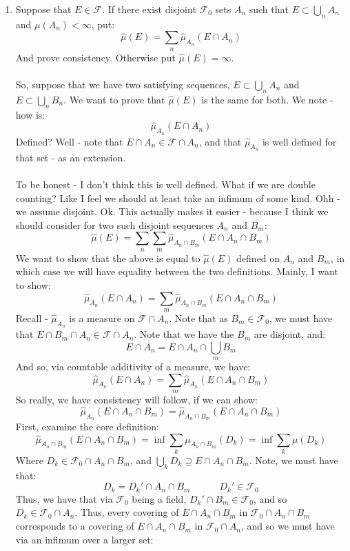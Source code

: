 \documentclass[12pt,a4paper]{article}
\newcommand{\1}[1]{\mathbbm{1}\left\{ #1 \right\}}
\newcommand{\fcal}{\mathcal{F}}
\begin{document}
\begin{enumerate}
	\item Suppose that $E \in \fcal$. If there exist disjoint $\fcal_0$ sets $A_n$ such that $E \subset \bigcup_n A_n$ and $\mu(A_n) < \infty$, put:
	$$
		\hat{\mu}(E) = \sum_n \hat{\mu}_{A_n}(E \cap A_n)
	$$
	And prove consistency. Otherwise put $\hat{\mu}(E) = \infty$.
	\\\\
	So, suppose that we have two satisfying sequences, $E \subset \bigcup_n A_n$ and $E \subset \bigcup_n B_n$. We want to prove that $\hat{\mu}(E)$ is the same for both. We note - how is:
	$$
		\hat{\mu}_{A_n}(E \cap A_n)
	$$
	Defined? Well - note that $E \cap A_n \in \fcal \cap A_n$, and that $\hat{\mu}_{A_n}$ is well defined for that set - as an extension.
	\\\\
	To be honest - I don't think this is well defined. What if we are double counting? Like I feel we should at least take an infimum of some kind. Ohh - we assume disjoint. Ok. This actually makes it easier - because I think we should consider for two such disjoint sequences $A_n$ and $B_m$:
	$$
		\hat{\mu}(E) = \sum_n\sum_m \hat{\mu}_{A_n \cap B_m}(E \cap A_n \cap B_m)
	$$
	We want to show that the above is equal to $\hat{\mu}(E)$ defined on $A_n$ and $B_m$, in which case we will have equality between the two definitions. Mainly, I want to show:
	$$
		\hat{\mu}_{A_n}(E \cap A_n) = \sum_m \hat{\mu}_{A_n \cap B_m}(E \cap A_n \cap B_m)
	$$
	Recall - $\hat{\mu}_{A_n}$ is a measure on $\fcal \cap A_n$. Note that as $B_m \in \fcal_0$, we must have that $E \cap B_m \cap A_n \in \fcal \cap A_n$. Note that we have the $B_m$ are disjoint, and:
	$$
		E \cap A_n = E \cap A_n \cap \bigcup_m B_m
	$$
	And so, via countable additivity of a measure, we have:
	$$
		\hat{\mu}_{A_n}(E \cap A_n) = \sum_m \hat{\mu}_{A_n}(E \cap A_n \cap B_m)
	$$
	So really, we have consistency will follow, if we can show:
	$$
		\hat{\mu}_{A_n}(E \cap A_n \cap B_m) = \hat{\mu}_{A_n \cap B_m}(E \cap A_n \cap B_m)
	$$
	First, examine the core definition:
	$$
		\hat{\mu}_{A_n \cap B_m}(E \cap A_n \cap B_m) =
		\inf \sum_k \mu_{A_n \cap B_m}(D_k) =
		\inf \sum_k \mu(D_k)
	$$
	Where $D_k \in \fcal_0 \cap A_n \cap B_m$, and $\bigcup_k D_k \supseteq E \cap A_n \cap B_m$. Note, we must have that:
	$$
		D_k = D_k' \cap A_n \cap B_m \quad\quad\quad D_k' \in \fcal_0
	$$
	Thus, we have that via $\fcal_0$ being a field, $D_k' \cap B_m \in \fcal_0$, and so $D_k \in \fcal_0 \cap A_n$. Thus, every covering of $E \cap A_n \cap B_m$ in $\fcal_0 \cap A_n \cap B_m$ corresponds to a covering of $E \cap A_n \cap B_m$ in $\fcal_0 \cap A_n$, and so we must have via an infimum over a larger set:

\end{enumerate}
\end{document}
